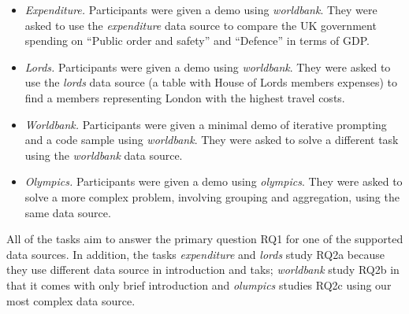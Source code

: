 \documentclass[manuscript,review,anonymous]{acmart}
\begin{document}
\begin{itemize}
\item \emph{Expenditure.} Participants were given a demo using \emph{worldbank}.
  They were asked to use the \emph{expenditure} data source to compare the UK government spending
  on ``Public order and safety'' and ``Defence'' in terms of GDP.
\item \emph{Lords.} Participants were given a demo using \emph{worldbank}.
  They were asked to use the \emph{lords} data source (a table with House of Lords
  members expenses) to find a members representing London with the highest travel costs.
\item \emph{Worldbank.} Participants were given a minimal demo of iterative prompting and
  a code sample using \emph{worldbank}. They were asked to solve a different task using
  the \emph{worldbank} data source.
\item \emph{Olympics.} Participants were given a demo using \emph{olympics}.
  They were asked to solve a more complex problem, involving grouping and aggregation,
  using the same data source.
\end{itemize}

%
%

\noindent
All of the tasks aim to answer the primary question RQ1 for one of the supported data sources.
In addition, the tasks \emph{expenditure} and \emph{lords} study RQ2a because they use different
data source in introduction and taks; \emph{worldbank} study RQ2b in that it comes with only brief
introduction and \emph{olumpics} studies RQ2c using our most complex data source.
\end{document}
